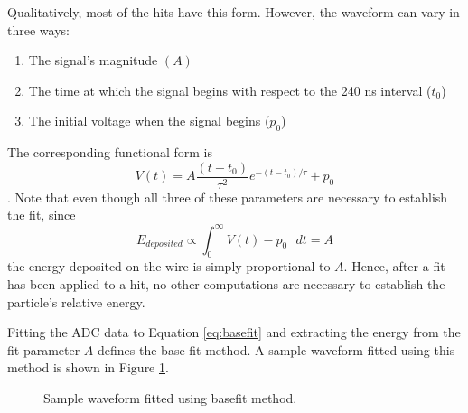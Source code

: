 Qualitatively, most of the hits have this form. However, the waveform can vary in three ways:
\begin{enumerate}
\item The signal's magnitude $(A)$
\item The time at which the signal begins with respect to the 240 ns interval ($t_0$)
\item The initial voltage when the signal begins ($p_0$)
\end{enumerate}
The corresponding functional form is
\begin{equation}
  V(t) = A \frac{(t - t_0)}{\tau^2} e^{-(t - t_0) / \tau} + p_0
  \label{eq:basefit}
\end{equation}.
Note that even though all three of these parameters are necessary to establish the fit, since 
\begin{equation}
  E_{deposited} \propto \int_{0}^{\infty} V(t) - p_0 \text{ } dt = A
\end{equation}
 the energy deposited on the wire is simply proportional to $A$. Hence, after a fit has been applied to a hit, no other computations are necessary to establish the particle's relative energy.

Fitting the ADC data to Equation \ref{eq:basefit}
and extracting the energy from the fit parameter $A$ defines the base fit method. A sample waveform fitted using this method is shown in Figure \ref{fig:sampleBase}.

\begin{figure}[ht!]
    \centering
    \caption{Sample waveform fitted using basefit method.}
    \label{fig:sampleBase}
\end{figure} 



